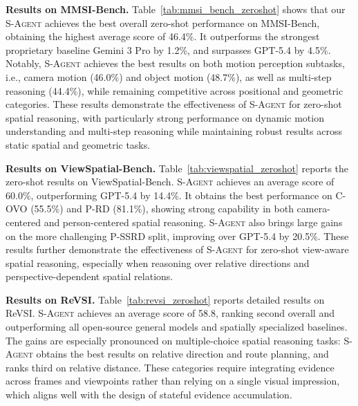 \documentclass{llmxive}
\begin{document}
\textbf{Results on MMSI-Bench.}
Table~\ref{tab:mmsi_bench_zeroshot} shows that our \textsc{S-Agent} achieves the best overall zero-shot performance on MMSI-Bench, obtaining the highest average score of 46.4\%. 
It outperforms the strongest proprietary baseline Gemini 3 Pro by 1.2\%, and surpasses GPT-5.4 by 4.5\%.
Notably, \textsc{S-Agent} achieves the best results on both motion perception subtasks, i.e., camera motion (46.0\%) and object motion (48.7\%), as well as multi-step reasoning (44.4\%), while remaining competitive across positional and geometric categories.
% 
These results demonstrate the effectiveness of \textsc{S-Agent} for zero-shot spatial reasoning, with particularly strong performance on dynamic motion understanding and multi-step reasoning while maintaining robust results across static spatial and geometric tasks.

\textbf{Results on ViewSpatial-Bench.}
Table~\ref{tab:viewspatial_zeroshot} reports the zero-shot results on ViewSpatial-Bench. \textsc{S-Agent} achieves an average score of 60.0\%, outperforming GPT-5.4 by 14.4\%. 
It obtains the best performance on C-OVO (55.5\%) and P-RD (81.1\%), showing strong capability in both camera-centered and person-centered spatial reasoning. 
\textsc{S-Agent} also brings large gains on the more challenging P-SSRD split, improving over GPT-5.4 by 20.5\%. These results further demonstrate the effectiveness of \textsc{S-Agent} for zero-shot view-aware spatial reasoning, especially when reasoning over relative directions and perspective-dependent spatial relations.

\textbf{Results on ReVSI.}
Table~\ref{tab:revsi_zeroshot} reports detailed results on ReVSI.
\textsc{S-Agent} achieves an average score of 58.8, ranking second overall and outperforming all open-source general models and spatially specialized baselines.
The gains are especially pronounced on multiple-choice spatial reasoning tasks: \textsc{S-Agent} obtains the best results on relative direction and route planning, and ranks third on relative distance.
These categories require integrating evidence across frames and viewpoints rather than relying on a single visual impression, which aligns well with the design of stateful evidence accumulation.
\end{document}
